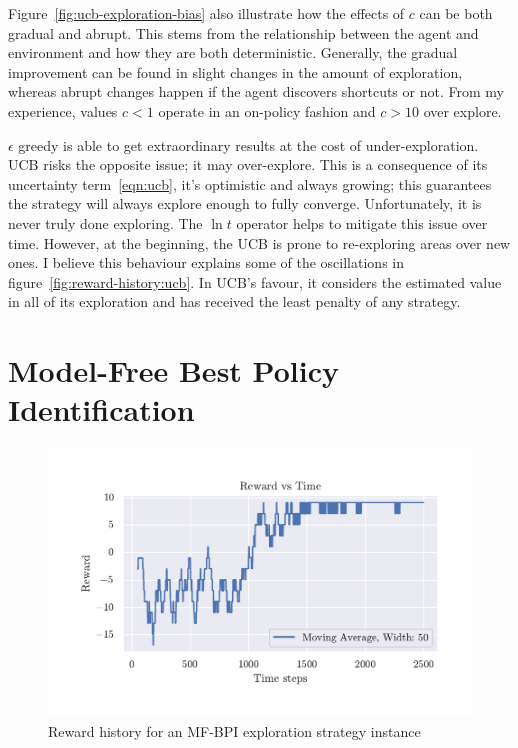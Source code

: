 \documentclass[]{final_report}
\begin{document}
Figure~\ref{fig:ucb-exploration-bias} also illustrate how the effects of $c$ can be both gradual and abrupt. This stems from the relationship between the agent and environment and how they are both deterministic. Generally, the gradual improvement can be found in slight changes in the amount of exploration, whereas abrupt changes happen if the agent discovers shortcuts or not.  From my experience, values $c<1$ operate in an on-policy fashion and $c>10$ over explore.

$\epsilon$ greedy is able to get extraordinary results at the cost of under-exploration. UCB risks the opposite issue; it may over-explore. This is a consequence of its uncertainty term~\ref{eqn:ucb}, it's optimistic and always growing; this guarantees the strategy will always explore enough to fully converge. Unfortunately, it is never truly done exploring. The $\ln t$ operator helps to mitigate this issue over time. However, at the beginning, the UCB is prone to re-exploring areas over new ones. I believe this behaviour explains some of the oscillations in figure~\ref{fig:reward-history:ucb}. In UCB's favour, it considers the estimated value in all of its exploration and has received the least penalty of any strategy.


\section{Model-Free Best Policy Identification}

\begin{figure}[H]
  \centering
  
  \includegraphics[trim={0 1cm 0 1cm},clip,width=\textwidth]{reward-history/MF-BPI.pdf}
  
  \caption{\label{fig:reward-history:mfbpi} Reward history for an MF-BPI exploration strategy instance}
\end{figure}
\end{document}
